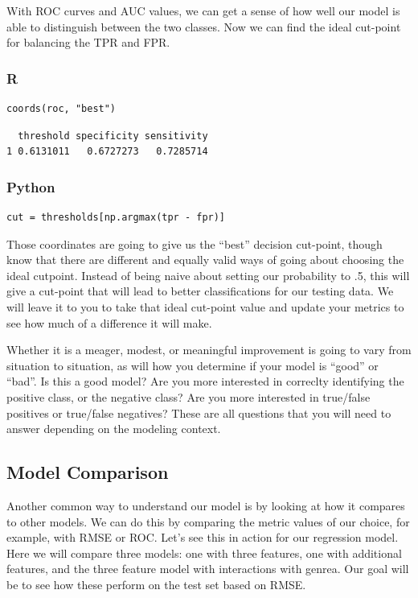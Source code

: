 \documentclass[
  letterpaper,
]{krantz}
\begin{document}
With ROC curves and AUC values, we can get a sense of how well our model
is able to distinguish between the two classes. Now we can find the
ideal cut-point for balancing the TPR and FPR.

\subsubsection{R}

\begin{verbatim}
coords(roc, "best")
\end{verbatim}

\begin{verbatim}
  threshold specificity sensitivity
1 0.6131011   0.6727273   0.7285714
\end{verbatim}

\subsubsection{Python}

\begin{verbatim}
cut = thresholds[np.argmax(tpr - fpr)]
\end{verbatim}

Those coordinates are going to give us the ``best'' decision cut-point,
though know that there are different and equally valid ways of going
about choosing the ideal cutpoint. Instead of being naive about setting
our probability to .5, this will give a cut-point that will lead to
better classifications for our testing data. We will leave it to you to
take that ideal cut-point value and update your metrics to see how much
of a difference it will make.

Whether it is a meager, modest, or meaningful improvement is going to
vary from situation to situation, as will how you determine if your
model is ``good'' or ``bad''. Is this a good model? Are you more
interested in correclty identifying the positive class, or the negative
class? Are you more interested in true/false positives or true/false
negatives? These are all questions that you will need to answer
depending on the modeling context.

\subsection{Model Comparison}\label{model-comparison}

Another common way to understand our model is by looking at how it
compares to other models. We can do this by comparing the metric values
of our choice, for example, with RMSE or ROC. Let's see this in action
for our regression model. Here we will compare three models: one with
three features, one with additional features, and the three feature
model with interactions with genrea. Our goal will be to see how these
perform on the test set based on RMSE.
\end{document}
